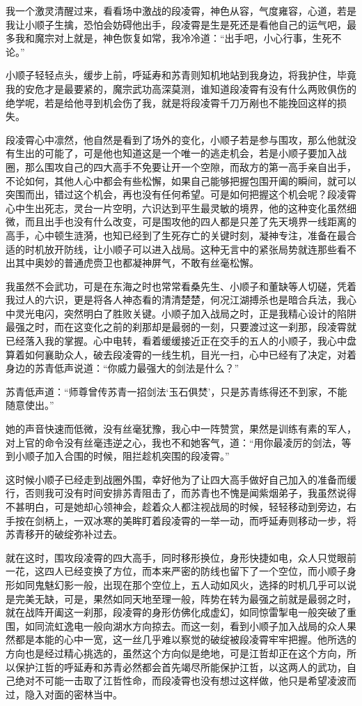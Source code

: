 我一个激灵清醒过来，看看场中激战的段凌霄，神色从容，气度雍容，心道，若是我让小顺子生擒，恐怕会妨碍他出手，段凌霄是生是死还是看他自己的运气吧，最多我和魔宗对上就是，神色恢复如常，我冷冷道：“出手吧，小心行事，生死不论。”

小顺子轻轻点头，缓步上前，呼延寿和苏青则知机地站到我身边，将我护住，毕竟我的安危才是最要紧的，魔宗武功高深莫测，谁知道段凌霄有没有什么两败俱伤的绝学呢，若是给他寻到机会伤了我，就是将段凌霄千刀万剐也不能挽回这样的损失。

段凌霄心中凛然，他自然是看到了场外的变化，小顺子若是参与围攻，那么他就没有生出的可能了，可是他也知道这是一个唯一的逃走机会，若是小顺子要加入战圈，那么围攻自己的四大高手不免要让开一个空隙，而敌方的第一高手亲自出手，不论如何，其他人心中都会有些松懈，如果自己能够把握包围开阖的瞬间，就可以突围而出，错过这个机会，再也没有任何希望。可是如何把握这个机会呢？段凌霄心中生出死志，灵台一片空明，六识达到平生最灵敏的境界，他的这种变化虽然细微，而且出手也没有什么改变，可是围攻他的四人都是只差了先天境界一线距离的高手，心中顿生涟漪，也知已经到了生死存亡的关键时刻，凝神专注，准备在最合适的时机放开防线，让小顺子可以进入战局。这种无言中的紧张局势就连那些看不出其中奥妙的普通虎赍卫也都凝神屏气，不敢有丝毫松懈。

我虽然不会武功，可是在东海之时也常常看桑先生、小顺子和董缺等人切磋，凭着我过人的六识，更是将各人神态看的清清楚楚，何况江湖搏杀也是暗合兵法，我心中灵光电闪，突然明白了胜败关键。小顺子加入战局之时，正是我精心设计的陷阱最强之时，而在这变化之前的刹那却是最弱的一刻，只要渡过这一刹那，段凌霄就已经落入我的掌握。心中电转，看着缓缓接近正在交手的五人的小顺子，我心中盘算着如何襄助众人，破去段凌霄的一线生机，目光一扫，心中已经有了决定，对着身边的苏青低声说道：“你威力最强大的剑法是什么？”

苏青低声道：“师尊曾传苏青一招剑法‘玉石俱焚’，只是苏青练得还不到家，不能随意使出。”

她的声音快速而低微，没有丝毫犹豫，我心中一阵赞赏，果然是训练有素的军人，对上官的命令没有丝毫违逆之心，我也不和她客气，道：“用你最凌厉的剑法，等到小顺子加入合围的时候，阻拦趁机突围的段凌霄。”

这时候小顺子已经走到战圈外围，幸好他为了让四大高手做好自己加入的准备而缓行，否则我可没有时间安排苏青阻击了，而苏青也不愧是闻紫烟弟子，我虽然说得不甚明白，可是她却心领神会，趁着众人都注视战局的时候，轻轻移动到旁边，右手按在剑柄上，一双冰寒的美眸盯着段凌霄的一举一动，而呼延寿则移动一步，将苏青移开的破绽弥补过去。

就在这时，围攻段凌霄的四大高手，同时移形换位，身形快捷如电，众人只觉眼前一花，这四人已经变换了方位，而本来严密的防线也留下了一个空位，而小顺子身形如同鬼魅幻影一般，出现在那个空位上，五人动如风火，选择的时机几乎可以说是完美无缺，可是，果然如同天地至理一般，阵势在转为最强之前就是最弱之时，就在战阵开阖这一刹那，段凌霄的身形仿佛化成虚幻，如同惊雷掣电一般突破了重围，如同流虹逸电一般向湖水方向掠去。而这一刻，看到小顺子加入战局的众人果然都是本能的心中一宽，这一丝几乎难以察觉的破绽被段凌霄牢牢把握。他所选的方向也是经过精心挑选的，虽然这个方向似是绝地，可是江哲却正在这个方向，所以保护江哲的呼延寿和苏青必然都会首先竭尽所能保护江哲，以这两人的武功，自己绝对不可能一击取了江哲性命，而段凌霄也没有想过这样做，他只是希望凌波而过，隐入对面的密林当中。


